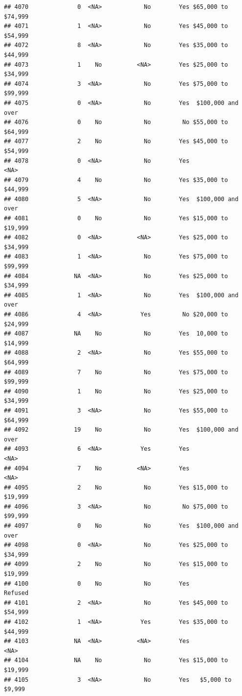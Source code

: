 \documentclass[man]{apa6}
\begin{document}
\begin{verbatim}
## 4070              0  <NA>            No        Yes $65,000 to $74,999
## 4071              1  <NA>            No        Yes $45,000 to $54,999
## 4072              8  <NA>            No        Yes $35,000 to $44,999
## 4073              1    No          <NA>        Yes $25,000 to $34,999
## 4074              3  <NA>            No        Yes $75,000 to $99,999
## 4075              0  <NA>            No        Yes  $100,000 and over
## 4076              0    No            No         No $55,000 to $64,999
## 4077              2    No            No        Yes $45,000 to $54,999
## 4078              0  <NA>            No        Yes               <NA>
## 4079              4    No            No        Yes $35,000 to $44,999
## 4080              5  <NA>            No        Yes  $100,000 and over
## 4081              0    No            No        Yes $15,000 to $19,999
## 4082              0  <NA>          <NA>        Yes $25,000 to $34,999
## 4083              1  <NA>            No        Yes $75,000 to $99,999
## 4084             NA  <NA>            No        Yes $25,000 to $34,999
## 4085              1  <NA>            No        Yes  $100,000 and over
## 4086              4  <NA>           Yes         No $20,000 to $24,999
## 4087             NA    No            No        Yes  10,000 to $14,999
## 4088              2  <NA>            No        Yes $55,000 to $64,999
## 4089              7    No            No        Yes $75,000 to $99,999
## 4090              1    No            No        Yes $25,000 to $34,999
## 4091              3  <NA>            No        Yes $55,000 to $64,999
## 4092             19    No            No        Yes  $100,000 and over
## 4093              6  <NA>           Yes        Yes               <NA>
## 4094              7    No          <NA>        Yes               <NA>
## 4095              2    No            No        Yes $15,000 to $19,999
## 4096              3  <NA>            No         No $75,000 to $99,999
## 4097              0    No            No        Yes  $100,000 and over
## 4098              0  <NA>            No        Yes $25,000 to $34,999
## 4099              2    No            No        Yes $15,000 to $19,999
## 4100              0    No            No        Yes            Refused
## 4101              2  <NA>            No        Yes $45,000 to $54,999
## 4102              1  <NA>           Yes        Yes $35,000 to $44,999
## 4103             NA  <NA>          <NA>        Yes               <NA>
## 4104             NA    No            No        Yes $15,000 to $19,999
## 4105              3  <NA>            No        Yes   $5,000 to $9,999

\end{verbatim}
\end{document}
